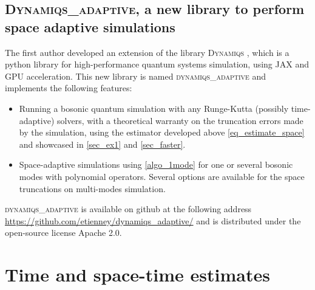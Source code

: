 \documentclass[a4paper,onecolumn,amsmath,amssymb,amsfonts,accepted=2026-03-06]{quantumarticle}
\begin{document}
\subsection{\textsc{Dynamiqs\_adaptive}, a new library to perform space adaptive simulations}
\label{sub_sec:dynamiqs_adaptive}
The first author developed an extension of the library \textsc{Dynamiqs} \cite{guilmin2024dynamiqs}, which is a python library for high-performance quantum systems simulation, using JAX and GPU acceleration. This new library is named \textsc{dynamiqs\_adaptive} and implements the following features:
\begin{itemize}
    \item Running a bosonic quantum simulation with any Runge-Kutta (possibly time-adaptive) solvers, with a theoretical warranty on the truncation errors made by the simulation, using the estimator developed above \cref{eq_estimate_space} and showcased in \cref{sec_ex1} and \cref{sec_faster}.
    \item Space-adaptive simulations using \cref{algo_1mode} for one or several bosonic modes with polynomial operators. Several options are available for the space truncations on multi-modes simulation.
\end{itemize}
	\textsc{dynamiqs\_adaptive} is available on github at the following address \url{https://github.com/etienney/dynamiqs_adaptive/} and is distributed under the open-source license Apache 2.0.


\section{Time and space-time estimates}
\label{sec:time_estimator}
\end{document}
